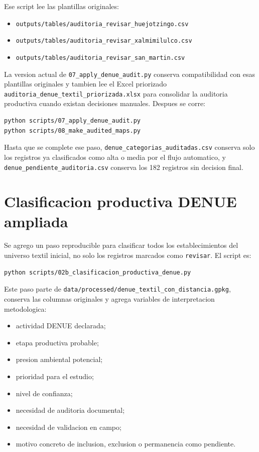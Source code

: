 \documentclass[11pt,letterpaper]{article}
\begin{document}
Ese script lee las plantillas originales:

\begin{itemize}
  \item \texttt{outputs/tables/auditoria\_revisar\_huejotzingo.csv}
  \item \texttt{outputs/tables/auditoria\_revisar\_xalmimilulco.csv}
  \item \texttt{outputs/tables/auditoria\_revisar\_san\_martin.csv}
\end{itemize}

La version actual de \texttt{07\_apply\_denue\_audit.py} conserva compatibilidad con esas plantillas originales y tambien lee el Excel priorizado \texttt{auditoria\_denue\_textil\_priorizada.xlsx} para consolidar la auditoria productiva cuando existan decisiones manuales. Despues se corre:

\begin{verbatim}
python scripts/07_apply_denue_audit.py
python scripts/08_make_audited_maps.py
\end{verbatim}

Hasta que se complete ese paso, \texttt{denue\_categorias\_auditadas.csv} conserva solo los registros ya clasificados como alta o media por el flujo automatico, y \texttt{denue\_pendiente\_auditoria.csv} conserva los 182 registros sin decision final.

\section{Clasificacion productiva DENUE ampliada}

Se agrego un paso reproducible para clasificar todos los establecimientos del universo textil inicial, no solo los registros marcados como \texttt{revisar}. El script es:

\begin{verbatim}
python scripts/02b_clasificacion_productiva_denue.py
\end{verbatim}

Este paso parte de \texttt{data/processed/denue\_textil\_con\_distancia.gpkg}, conserva las columnas originales y agrega variables de interpretacion metodologica:

\begin{itemize}
  \item actividad DENUE declarada;
  \item etapa productiva probable;
  \item presion ambiental potencial;
  \item prioridad para el estudio;
  \item nivel de confianza;
  \item necesidad de auditoria documental;
  \item necesidad de validacion en campo;
  \item motivo concreto de inclusion, exclusion o permanencia como pendiente.
\end{itemize}
\end{document}
